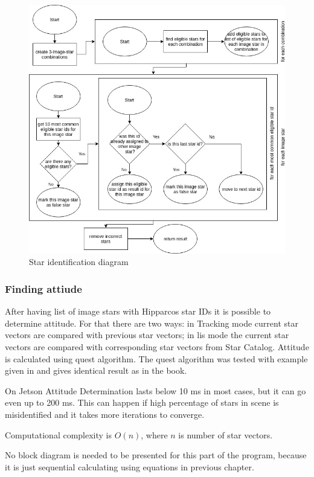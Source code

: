 \documentclass[12pt,a4paper,twoside]{article}
\begin{document}
\begin{figure}[!htbp]
\includegraphics[scale=0.55]{star_identifier_diagram.jpg}
\centering
\caption{Star identification diagram}
\label{fig:star_identifier_diagram}
\end{figure}


\subsubsection{Finding attiude}
After having list of image stars with Hipparcos star IDs it is possible to determine attitude. For that there are two ways: in Tracking mode current star vectors are compared with previous star vectors; in \gls{lis} mode the current star vectors are compared with corresponding star vectors from Star Catalog. Attitude is calculated using \gls{quest} algorithm. The \gls{quest} algorithm was tested with example given in\cite{hall2003spacecraft} and gives identical result as in the book.

On Jetson Attitude Determination lasts below 10 ms in most cases, but it can go even up to 200 ms. This can happen if high percentage of stars in scene is misidentified and it takes more iterations to converge.

Computational complexity is $O(n)$, where $n$ is number of star vectors.

No block diagram is needed to be presented for this part of the program, because it is just sequential calculating using equations in previous chapter.
\end{document}
